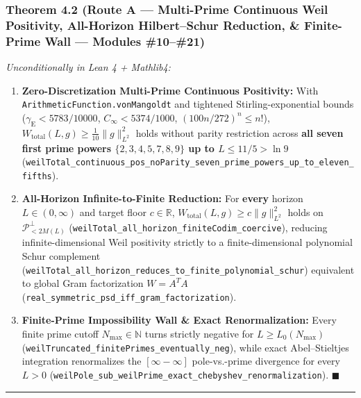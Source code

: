 \documentclass[
  11pt,
]{article}
\providecommand{\tightlist}{%
  \setlength{\itemsep}{0pt}\setlength{\parskip}{0pt}}
\begin{document}
\subsubsection{Theorem 4.2 (Route A --- Multi-Prime Continuous Weil
Positivity, All-Horizon Hilbert--Schur Reduction, \& Finite-Prime Wall
--- Modules
\#10--\#21)}\label{theorem-4.2-route-a-multi-prime-continuous-weil-positivity-all-horizon-hilbertschur-reduction-finite-prime-wall-modules-1021}

\emph{Unconditionally in Lean 4 + Mathlib4:}

\begin{enumerate}
\def\labelenumi{\arabic{enumi}.}
\tightlist
\item
  \textbf{Zero-Discretization Multi-Prime Continuous Positivity:} With
  \texttt{ArithmeticFunction.vonMangoldt} and tightened
  Stirling-exponential bounds (\(\gamma_{\text{E}} < 5783/10000\),
  \(C_\infty < 5374/1000\), \((100n/272)^n \le n!\)),
  \(W_{\text{total}}(L, g) \ge \frac{1}{10}\|g\|_{L^2}^2\) holds without
  parity restriction across \textbf{all seven first prime powers
  \(\{2,3,4,5,7,8,9\}\) up to \(L \le 11/5 > \ln 9\)}
  (\texttt{weilTotal\_continuous\_pos\_noParity\_seven\_prime\_powers\_up\_to\_eleven\_fifths}).
\item
  \textbf{All-Horizon Infinite-to-Finite Reduction:} For \textbf{every}
  horizon \(L \in (0, \infty)\) and target floor \(c \in \mathbb{R}\),
  \(W_{\text{total}}(L, g) \ge c\|g\|_{L^2}^2\) holds on
  \(\mathcal{P}_{<2M(L)}^\perp\)
  (\texttt{weilTotal\_all\_horizon\_finiteCodim\_coercive}), reducing
  infinite-dimensional Weil positivity strictly to a finite-dimensional
  polynomial Schur complement
  (\texttt{weilTotal\_all\_horizon\_reduces\_to\_finite\_polynomial\_schur})
  equivalent to global Gram factorization \(W = A^T A\)
  (\texttt{real\_symmetric\_psd\_iff\_gram\_factorization}).
\item
  \textbf{Finite-Prime Impossibility Wall \& Exact Renormalization:}
  Every finite prime cutoff \(N_{\max} \in \mathbb{N}\) turns strictly
  negative for \(L \ge L_0(N_{\max})\)
  (\texttt{weilTruncated\_finitePrimes\_eventually\_neg}), while exact
  Abel--Stieltjes integration renormalizes the \([\infty - \infty]\)
  pole-vs.-prime divergence for every \(L > 0\)
  (\texttt{weilPole\_sub\_weilPrime\_exact\_chebyshev\_renormalization}).
  \(\blacksquare\)
\end{enumerate}

\begin{center}\rule{0.5\linewidth}{0.5pt}\end{center}
\end{document}
